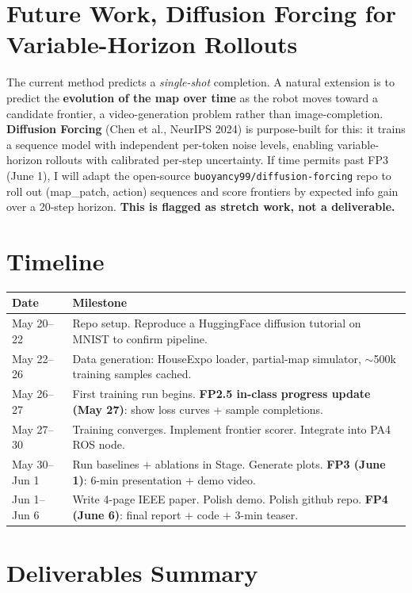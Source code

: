 \documentclass[11pt]{article}
\begin{document}
\section{Future Work, Diffusion Forcing for Variable-Horizon Rollouts}

The current method predicts a \emph{single-shot} completion. A natural extension is to predict the \textbf{evolution of the map over time} as the robot moves toward a candidate frontier, a video-generation problem rather than image-completion. \textbf{Diffusion Forcing} (Chen et al., NeurIPS 2024) is purpose-built for this: it trains a sequence model with independent per-token noise levels, enabling variable-horizon rollouts with calibrated per-step uncertainty. If time permits past FP3 (June 1), I will adapt the open-source \texttt{buoyancy99/diffusion-forcing} repo to roll out (map\_patch, action) sequences and score frontiers by expected info gain over a 20-step horizon. \textbf{This is flagged as stretch work, not a deliverable.}

\section{Timeline}

\begin{tabular}{l p{}}
\toprule
\textbf{Date} & \textbf{Milestone} \\
\midrule
May 20--22 & Repo setup. Reproduce a HuggingFace diffusion tutorial on MNIST to confirm pipeline. \\
May 22--26 & Data generation: HouseExpo loader, partial-map simulator, $\sim$500k training samples cached. \\
May 26--27 & First training run begins. \textbf{FP2.5 in-class progress update (May 27)}: show loss curves + sample completions. \\
May 27--30 & Training converges. Implement frontier scorer. Integrate into PA4 ROS node. \\
May 30--Jun 1 & Run baselines + ablations in Stage. Generate plots. \textbf{FP3 (June 1)}: 6-min presentation + demo video. \\
Jun 1--Jun 6 & Write 4-page IEEE paper. Polish demo. Polish github repo. \textbf{FP4 (June 6)}: final report + code + 3-min teaser. \\
\bottomrule
\end{tabular}

\section{Deliverables Summary}
\end{document}
